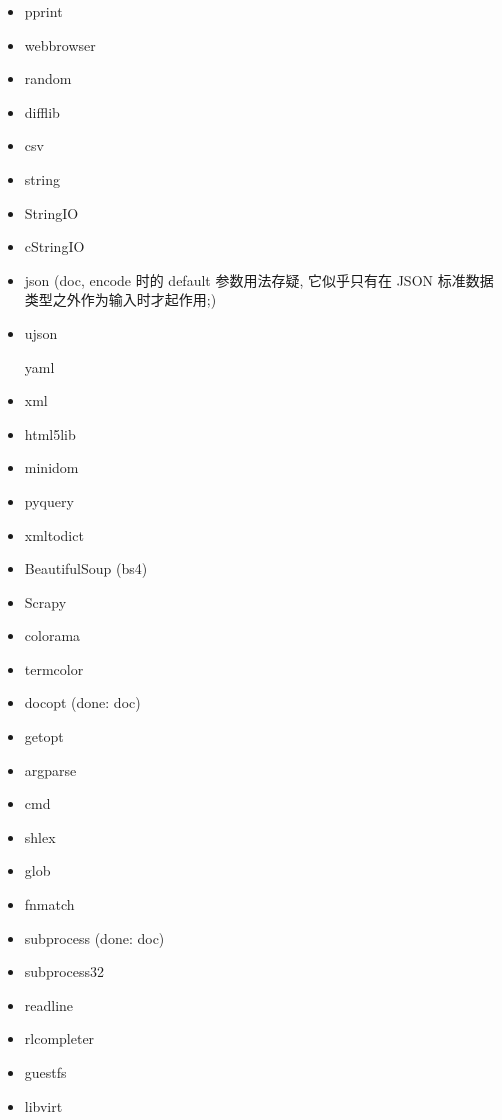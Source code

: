 \documentclass{article}
\begin{document}
\begin{enumerate}
\begin{itemize}
            \item pprint
            \item webbrowser
            \item random
            \item difflib
            \item csv

            \item string
            \item StringIO
            \item cStringIO

            \item json (doc, encode 时的 default 参数用法存疑, 它似乎只有在 JSON 标准数据类型之外作为输入时才起作用;)
            \item ujson

            \itme yaml

            \item xml
            \item html5lib
            \item minidom
            \item pyquery
            \item xmltodict
            \item BeautifulSoup (bs4)
            \item Scrapy

            \item colorama
            \item termcolor
            \item docopt (done: doc)
            \item getopt
            \item argparse
            \item cmd
            \item shlex
            \item glob
            \item fnmatch
            \item subprocess (done: doc)
            \item subprocess32
            \item readline
            \item rlcompleter

            \item guestfs
            \item libvirt


\end{itemize}
\end{enumerate}
\end{document}
